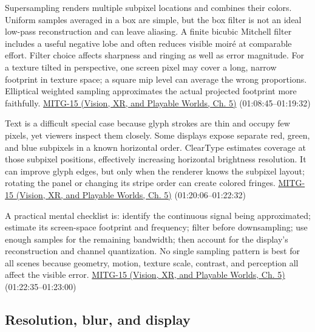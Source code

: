 Supersampling renders multiple subpixel locations and combines their colors. Uniform samples averaged in a box are simple, but the box filter is not an ideal low-pass reconstruction and can leave aliasing. A finite bicubic Mitchell filter includes a useful negative lobe and often reduces visible moiré at comparable effort. Filter choice affects sharpness and ringing as well as error magnitude. For a texture tilted in perspective, one screen pixel may cover a long, narrow footprint in texture space; a square mip level can average the wrong proportions. Elliptical weighted sampling approximates the actual projected footprint more faithfully. \href{../07-Vision-XR-and-Playable-Worlds/main.pdf\#nameddest=04-visual-computing-ii-ch036-mitg-15---antialiasing}{MITG-15 (Vision, XR, and Playable Worlds, Ch. 5)} (01:08:45--01:19:32)

Text is a difficult special case because glyph strokes are thin and occupy few pixels, yet viewers inspect them closely. Some displays expose separate red, green, and blue subpixels in a known horizontal order. ClearType estimates coverage at those subpixel positions, effectively increasing horizontal brightness resolution. It can improve glyph edges, but only when the renderer knows the subpixel layout; rotating the panel or changing its stripe order can create colored fringes. \href{../07-Vision-XR-and-Playable-Worlds/main.pdf\#nameddest=04-visual-computing-ii-ch036-mitg-15---antialiasing}{MITG-15 (Vision, XR, and Playable Worlds, Ch. 5)} (01:20:06--01:22:32)

A practical mental checklist is: identify the continuous signal being approximated; estimate its screen-space footprint and frequency; filter before downsampling; use enough samples for the remaining bandwidth; then account for the display's reconstruction and channel quantization. No single sampling pattern is best for all scenes because geometry, motion, texture scale, contrast, and perception all affect the visible error. \href{../07-Vision-XR-and-Playable-Worlds/main.pdf\#nameddest=04-visual-computing-ii-ch036-mitg-15---antialiasing}{MITG-15 (Vision, XR, and Playable Worlds, Ch. 5)} (01:22:35--01:23:00)

\subsection{Resolution, blur, and display}\label{03-visual-computing-i-ch004-resolution-blur-and-display}

\hypertarget{03-visual-computing-i-ch004-resolution-blur-and-display}{}

